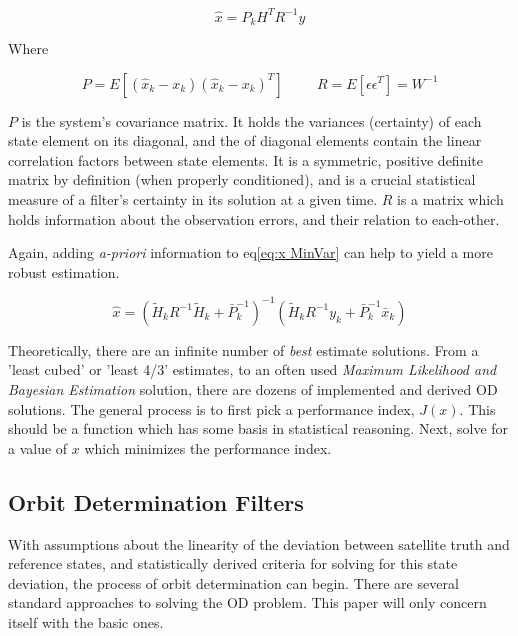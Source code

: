 \documentclass[12pt,a4paper,oneside]{article}
\numberwithin{equation}{section}   		%
\begin{document}
\begin{equation}
	\hat{x} = P_k H^T R^{-1} y
	\label{eq:x MinVar}
\end{equation}

Where

\begin{displaymath}
	P = E[(\hat{x}_k - x_k)(\hat{x}_k - x_k)^T]
	\hspace{1cm}
	R=E[\epsilon \epsilon^T] = W^{-1}
\end{displaymath}


$P$ is the system's covariance matrix. It holds the variances (certainty) of each state element on its diagonal, and the of diagonal elements contain the linear correlation factors between state elements. It is a symmetric, positive definite matrix by definition (when properly conditioned), and is a crucial statistical measure of a filter's certainty in its solution at a given time. $R$ is a matrix which holds information about the observation errors, and their relation to each-other. 

Again, adding \emph{a-priori} information to eq\eqref{eq:x MinVar} can help to yield a more robust estimation.

\begin{equation}
	\hat{x} = (\tilde{H}_k R^{-1} \tilde{H}_k + \bar{P}_k^{-1})^{-1}   (\tilde{H}_k R^{-1} y_k + \bar{P}_k^{-1} \bar{x}_k)
	\label{eq:x MinVarap}
\end{equation}

Theoretically, there are an infinite number of \emph{best} estimate solutions. From a 'least cubed' or 'least 4/3' estimates, to an often used \emph{Maximum Likelihood and Bayesian Estimation} solution, there are dozens of implemented and derived OD solutions. The general process is to first pick a performance index, $J(x)$. This should be a function which has some basis in statistical reasoning. Next, solve for a value of $x$ which minimizes the performance index. 




\subsection{Orbit Determination Filters} 
\label{sec:Filters}
With assumptions about the linearity of the deviation between satellite truth and reference states, and statistically derived criteria for solving for this state deviation, the process of orbit determination can begin. There are several standard approaches to solving the OD problem. This paper will only concern itself with the basic ones.  
\end{document}
